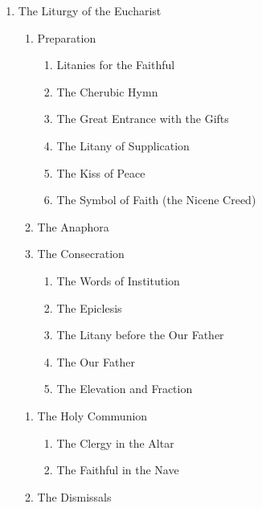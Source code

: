 \documentclass[
]{article}
\begin{document}
\begin{enumerate}
\def\labelenumi{\arabic{enumi}.}
\item
  The Liturgy of the Eucharist

  \begin{enumerate}
  \def\labelenumii{\arabic{enumii}.}
  \item
    Preparation

    \begin{enumerate}
    \def\labelenumiii{\arabic{enumiii}.}
    \item
      Litanies for the Faithful
    \item
      The Cherubic Hymn
    \item
      The Great Entrance with the Gifts
    \item
      The Litany of Supplication
    \item
      The Kiss of Peace
    \item
      The Symbol of Faith (the Nicene Creed)
    \end{enumerate}
  \item
    The Anaphora
  \item
    The Consecration

    \begin{enumerate}
    \def\labelenumiii{\arabic{enumiii}.}
    \item
      The Words of Institution
    \item
      The Epiclesis
    \item
      The Litany before the Our Father
    \item
      The Our Father
    \item
      The Elevation and Fraction
    \end{enumerate}
  \end{enumerate}

  \begin{enumerate}
  \def\labelenumii{\arabic{enumii}.}
  \item
    The Holy Communion

    \begin{enumerate}
    \def\labelenumiii{\arabic{enumiii}.}
    \item
      The Clergy in the Altar
    \item
      The Faithful in the Nave
    \end{enumerate}
  \item
    The Dismissals
  \end{enumerate}
\end{enumerate}
\end{document}
